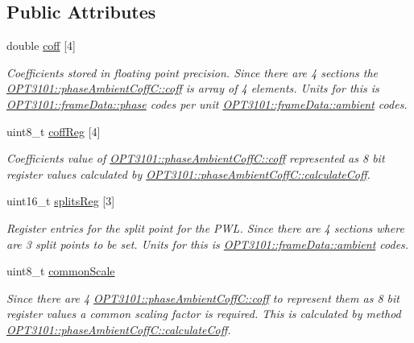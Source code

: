 \subsection*{Public Attributes}
\begin{DoxyCompactItemize}
\item 
double \mbox{\hyperlink{class_o_p_t3101_1_1phase_ambient_coff_c_af655f6704c4b3901b82a913f8a047258}{coff}} \mbox{[}4\mbox{]}
\begin{DoxyCompactList}\small\item\em Coefficients stored in floating point precision. Since there are 4 sections the \mbox{\hyperlink{class_o_p_t3101_1_1phase_ambient_coff_c_af655f6704c4b3901b82a913f8a047258}{O\+P\+T3101\+::phase\+Ambient\+Coff\+C\+::coff}} is array of 4 elements. Units for this is \mbox{\hyperlink{class_o_p_t3101_1_1frame_data_af8661d11405953dc378ad4d7cb0f2db6}{O\+P\+T3101\+::frame\+Data\+::phase}} codes per unit \mbox{\hyperlink{class_o_p_t3101_1_1frame_data_a39ebf8bd06141bef6986e49013d03c35}{O\+P\+T3101\+::frame\+Data\+::ambient}} codes. \end{DoxyCompactList}\item 
uint8\+\_\+t \mbox{\hyperlink{class_o_p_t3101_1_1phase_ambient_coff_c_a267c8f925dedeb8af97aba7ffae95da4}{coff\+Reg}} \mbox{[}4\mbox{]}
\begin{DoxyCompactList}\small\item\em Coefficients value of \mbox{\hyperlink{class_o_p_t3101_1_1phase_ambient_coff_c_af655f6704c4b3901b82a913f8a047258}{O\+P\+T3101\+::phase\+Ambient\+Coff\+C\+::coff}} represented as 8 bit register values calculated by \mbox{\hyperlink{class_o_p_t3101_1_1phase_ambient_coff_c_ac8f4dfff191b0adc7be044f39500e242}{O\+P\+T3101\+::phase\+Ambient\+Coff\+C\+::calculate\+Coff}}. \end{DoxyCompactList}\item 
uint16\+\_\+t \mbox{\hyperlink{class_o_p_t3101_1_1phase_ambient_coff_c_a5a2e9d6a0622f02024eaa8a1d2ec0011}{splits\+Reg}} \mbox{[}3\mbox{]}
\begin{DoxyCompactList}\small\item\em Register entries for the split point for the P\+WL. Since there are 4 sections where are 3 split points to be set. Units for this is \mbox{\hyperlink{class_o_p_t3101_1_1frame_data_a39ebf8bd06141bef6986e49013d03c35}{O\+P\+T3101\+::frame\+Data\+::ambient}} codes. \end{DoxyCompactList}\item 
uint8\+\_\+t \mbox{\hyperlink{class_o_p_t3101_1_1phase_ambient_coff_c_abed8ff9971976201638badbda9fd4543}{common\+Scale}}
\begin{DoxyCompactList}\small\item\em Since there are 4 \mbox{\hyperlink{class_o_p_t3101_1_1phase_ambient_coff_c_af655f6704c4b3901b82a913f8a047258}{O\+P\+T3101\+::phase\+Ambient\+Coff\+C\+::coff}} to represent them as 8 bit register values a common scaling factor is required. This is calculated by method \mbox{\hyperlink{class_o_p_t3101_1_1phase_ambient_coff_c_ac8f4dfff191b0adc7be044f39500e242}{O\+P\+T3101\+::phase\+Ambient\+Coff\+C\+::calculate\+Coff}}. \end{DoxyCompactList}\end{DoxyCompactItemize}
